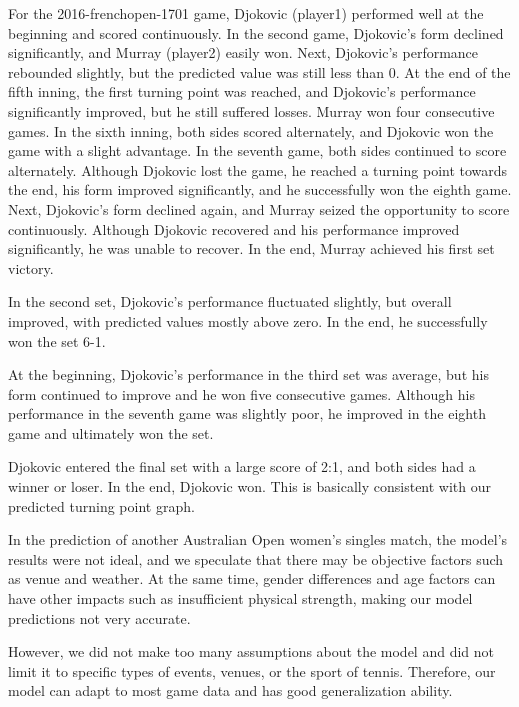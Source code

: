 \documentclass{mcmthesis}
\begin{document}
For the 2016-frenchopen-1701 game, Djokovic (player1) performed well at the beginning and scored continuously. In the second game, Djokovic's form declined significantly, and Murray (player2) easily won. Next, Djokovic's performance rebounded slightly, but the predicted value was still less than 0. At the end of the fifth inning, the first turning point was reached, and Djokovic's performance significantly improved, but he still suffered losses. Murray won four consecutive games. In the sixth inning, both sides scored alternately, and Djokovic won the game with a slight advantage. In the seventh game, both sides continued to score alternately. Although Djokovic lost the game, he reached a turning point towards the end, his form improved significantly, and he successfully won the eighth game. Next, Djokovic's form declined again, and Murray seized the opportunity to score continuously. Although Djokovic recovered and his performance improved significantly, he was unable to recover. In the end, Murray achieved his first set victory.

In the second set, Djokovic's performance fluctuated slightly, but overall improved, with predicted values mostly above zero. In the end, he successfully won the set 6-1.

At the beginning, Djokovic's performance in the third set was average, but his form continued to improve and he won five consecutive games. Although his performance in the seventh game was slightly poor, he improved in the eighth game and ultimately won the set.

Djokovic entered the final set with a large score of 2:1, and both sides had a winner or loser. In the end, Djokovic won. This is basically consistent with our predicted turning point graph.

In the prediction of another Australian Open women's singles match, the model's results were not ideal, and we speculate that there may be objective factors such as venue and weather. At the same time, gender differences and age factors can have other impacts such as insufficient physical strength, making our model predictions not very accurate.

However, we did not make too many assumptions about the model and did not limit it to specific types of events, venues, or the sport of tennis. Therefore, our model can adapt to most game data and has good generalization ability.
\end{document}
